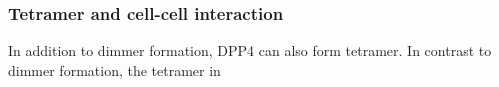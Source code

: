 \subsubsection{Tetramer and cell-cell interaction}

In addition to dimmer formation, DPP4 can also form tetramer. In contrast to dimmer formation, the tetramer in